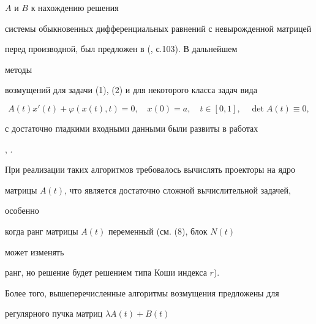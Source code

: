 $A$ и $B$ к нахождению решения


системы обыкновенных дифференциальных равнений с невырожденной матрицей


перед производной, был предложен в (\cite{Boy}, с.103). В дальнейшем


методы


возмущений для задачи (1), (2) и для некоторого класса задач вида


$$


A(t)x'(t)+\varphi(x(t),t)=0,\quad x(0)=a,\quad


t\in [0,1],\quad \det A(t)\equiv 0,


$$


с достаточно гладкими входными данными были развиты в работах


\cite{Han}, \cite{Marz}.





При реализации таких алгоритмов требовалось вычислять проекторы на ядро


матрицы $A(t)$, что является достаточно сложной вычислительной задачей,


особенно


когда ранг матрицы $A(t)$ переменный (см. (8), блок $N(t)$


может изменять


ранг, но решение будет решением типа Коши индекса $r$).





Более того, вышеперечисленные алгоритмы возмущения предложены для


регулярного пучка матриц $\lambda A(t)+B(t)$





